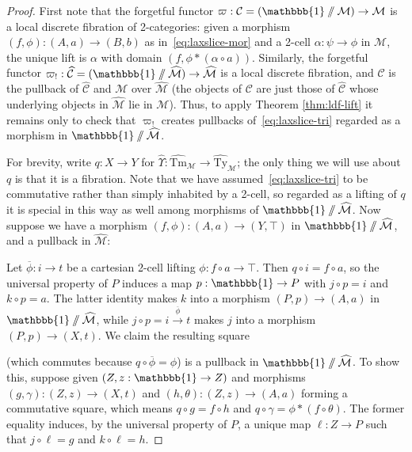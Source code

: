 \documentclass[10pt]{article}
\theoremstyle{definition}
\newcommand\M{\mathcal{M}}
\newcommand\Mhat{\widehat{\mathcal{M}}}
\newcommand\Mtyhat{{\widehat{\mathrm{Ty}}_{\M}}}
\newcommand\Mtmhat{{\widehat{\mathrm{Tm}}_{\M}}}
\newcommand\Upshat{{\widehat{\Upsilon}}}
\newcommand\C{\mathcal{C}}
\newcommand\Chat{{\widehat{\mathcal{C}}}}
\newcommand\vp{\varpi}
\newcommand\vpsh{\vp_!}
\newcommand\one{\mathbbb{1}}
\begin{document}
\begin{proof}
  First note that the forgetful functor $\vp:\C=(\one\sslash\M)\to\M$ is a local discrete fibration of 2-categories: given a morphism $(f,\phi):(A,a) \to (B,b)$ as in~\eqref{eq:laxslice-mor} and a 2-cell $\alpha:\psi\to\phi$ in $\M$, the unique lift is $\alpha$ with domain $(f,\phi * (\alpha \circ a))$.
  Similarly, the forgetful functor $\vpsh:\Chat=(\one\sslash\Mhat)\to\Mhat$ is a local discrete fibration, and $\C$ is the pullback of $\Chat$ and $\M$ over $\Mhat$ (the objects of $\C$ are just those of $\Chat$ whose underlying objects in $\Mhat$ lie in $\M$).
  Thus, to apply Theorem \ref{thm:ldf-lift} it remains only to check that $\vpsh$ creates pullbacks of~\eqref{eq:laxslice-tri} regarded as a morphism in $\one\sslash\Mhat$.

  For brevity, write $q:X\to Y$ for $\Upshat :\Mtmhat \to \Mtyhat$; the only thing we will use about $q$ is that it is a fibration.
  Note that we have assumed~\eqref{eq:laxslice-tri} to be commutative rather than simply inhabited by a 2-cell, so regarded as a lifting of $q$ it is special in this way as well among morphisms of $\one\sslash\Mhat$.
  Now suppose we have a morphism $(f,\phi) : (A,a) \to (Y,\top)$ in $\one\sslash\Mhat$, and a pullback in $\Mhat$:
  \begin{center}
  \end{center}
  Let $\overline{\phi} : i \to t$ be a cartesian 2-cell lifting $\phi : f \circ a \to \top$.
  Then $q \circ i = f\circ a$, so the universal property of $P$ induces a map $p:\one\to P$ with $j\circ p = i$ and $k\circ p = a$.
  The latter identity makes $k$ into a morphism $(P,p) \to (A,a)$ in $\one\sslash\Mhat$, while $j\circ p = i \xrightarrow{\overline{\phi}} t$ makes $j$ into a morphism $(P,p) \to (X,t)$.
  We claim the resulting square
  \begin{center}
  \end{center}
  (which commutes because $q \circ \overline{\phi} = \phi$) is a pullback in $\one\sslash\Mhat$.
  To show this, suppose given $(Z,z:\one\to Z)$ and morphisms $(g,\gamma):(Z,z) \to (X,t)$ and $(h,\theta):(Z,z) \to (A,a)$ forming a commutative square, which means $q\circ g = f\circ h$ and $q\circ \gamma = \phi * (f\circ \theta)$.
  The former equality induces, by the universal property of $P$, a unique map $\ell : Z\to P$ such that $j\circ \ell = g$ and $k\circ \ell = h$.


\end{proof}
\end{document}
